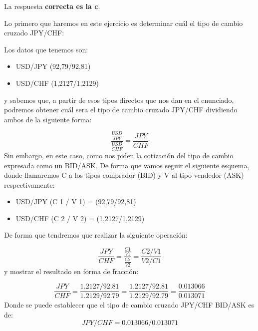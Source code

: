 \documentclass[
  letterpaper,
  DIV=11,
  numbers=noendperiod]{scrreprt}
\begin{document}
\begin{tcolorbox}[enhanced jigsaw, left=2mm, opacityback=0, colback=white, breakable, arc=.35mm, bottomrule=.15mm, rightrule=.15mm, toprule=.15mm, leftrule=.75mm, colframe=quarto-callout-tip-color-frame]
\begin{minipage}[t]{5.5mm}
\textcolor{quarto-callout-tip-color}{\faLightbulb}
\end{minipage}%
\begin{minipage}[t]{\textwidth - 5.5mm}

La respuesta \textbf{correcta es la c}.

Lo primero que haremos en este ejercicio es determinar cuál el tipo de
cambio cruzado JPY/CHF:

Los datos que tenemos son:

\begin{itemize}
\item
  USD/JPY (92,79/92,81)
\item
  USD/CHF (1,2127/1,2129)
\end{itemize}

y sabemos que, a partir de esos tipos directos que nos dan en el
enunciado, podremos obtener cuál sera el tipo de cambio cruzado JPY/CHF
dividiendo ambos de la siguiente forma:

\[\frac{\frac{USD}{JPY}}{\frac{USD}{CHF}}=\frac{JPY}{CHF}\] Sin embargo,
en este caso, como nos piden la cotización del tipo de cambio expresada
como un BID/ASK. De forma que vamos seguir el siguiente esquema, donde
llamaremos C a los tipos comprador (BID) y V al tipo vendedor (ASK)
respectivamente:

\begin{itemize}
\item
  USD/JPY (C 1 / V 1) = (92,79/92,81)
\item
  USD/CHF (C 2 / V 2) = (1,2127/1,2129)
\end{itemize}

De forma que tendremos que realizar la siguiente operación:

\[\frac{JPY}{CHF}=\frac{\frac{C 1}{V 1}}{\frac{C 2}{V 2}}=\frac{C 2 / V 1}{V 2 / C 1}\]
y mostrar el resultado en forma de fracción:

\[\frac{JPY}{CHF}=\frac{1.2127 / 92.81}{1.2129 / 92.79}=\frac{1.2127 / 92.81}{1.2129 / 92.79}=\frac{0.013066}{0.013071}\]
Donde se puede establecer que el tipo de cambio cruzado JPY/CHF BID/ASK
es de: \[JPY / CHF = 0.013066 / 0.013071 \]

\end{minipage}%
\end{tcolorbox}
\end{document}
